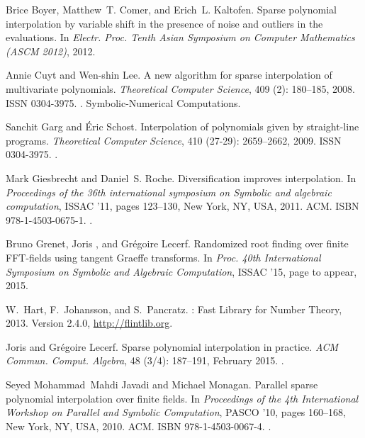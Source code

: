 \documentclass[letterpaper,10pt]{article}
\begin{document}
\begin{thebibliography}{21}
Brice Boyer, Matthew~T. Comer, and Erich~L. Kaltofen.
\newblock Sparse polynomial interpolation by variable shift in the presence of
  noise and outliers in the evaluations.
\newblock In \emph{Electr. Proc. Tenth Asian Symposium on Computer Mathematics
  (ASCM 2012)}, 2012.

Annie Cuyt and {Wen-shin} Lee.
\newblock A new algorithm for sparse interpolation of multivariate polynomials.
\newblock \emph{Theoretical Computer Science}, 409 (2):
  180--185, 2008.
\newblock ISSN 0304-3975.
\newblock {}.
\newblock Symbolic-Numerical Computations.

Sanchit Garg and {\'E}ric Schost.
\newblock Interpolation of polynomials given by straight-line programs.
\newblock \emph{Theoretical Computer Science}, 410 (27-29):
  2659--2662, 2009.
\newblock ISSN 0304-3975.
\newblock {}.

Mark Giesbrecht and Daniel~S. Roche.
\newblock Diversification improves interpolation.
\newblock In \emph{Proceedings of the 36th international symposium on Symbolic
  and algebraic computation}, ISSAC '11, pages 123--130, New York, NY, USA,
  2011. ACM.
\newblock ISBN 978-1-4503-0675-1.
\newblock {}.

Bruno Grenet, Joris , and Gr{\'e}goire Lecerf.
\newblock Randomized root finding over finite {FFT}-fields using tangent
  {G}raeffe transforms.
\newblock In \emph{Proc. 40th International Symposium on Symbolic and Algebraic
  Computation}, ISSAC '15, page to appear, 2015.

W.~Hart, F.~Johansson, and S.~Pancratz.
: {F}ast {L}ibrary for {N}umber {T}heory, 2013.
\newblock Version 2.4.0, \url{http://flintlib.org}.

Joris  and Gr{\'e}goire Lecerf.
\newblock Sparse polynomial interpolation in practice.
\newblock \emph{ACM Commun. Comput. Algebra}, 48 (3/4):
  187--191, February 2015.
\newblock {}.

Seyed Mohammad~Mahdi Javadi and Michael Monagan.
\newblock Parallel sparse polynomial interpolation over finite fields.
\newblock In \emph{Proceedings of the 4th International Workshop on Parallel
  and Symbolic Computation}, PASCO '10, pages 160--168, New York, NY, USA,
  2010. ACM.
\newblock ISBN 978-1-4503-0067-4.
\newblock {}.


\end{thebibliography}
\end{document}
